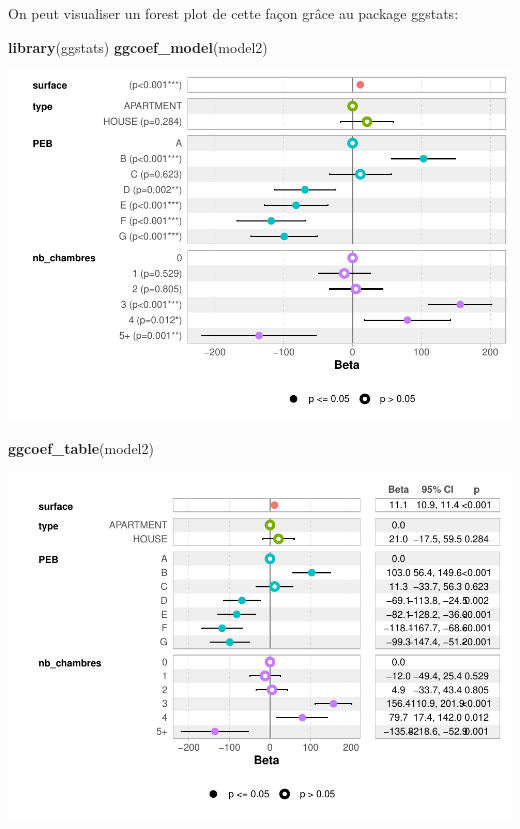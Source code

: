 \documentclass[
]{book}
\newenvironment{Shaded}{\begin{snugshade}}{\end{snugshade}}
\newcommand{\FunctionTok}[1]{\textcolor[rgb]{0.13,0.29,0.53}{\textbf{#1}}}
\newcommand{\NormalTok}[1]{#1}
\begin{document}
On peut visualiser un forest plot de cette façon grâce au package
ggstats:

\begin{Shaded}
\begin{Highlighting}[]
\FunctionTok{library}\NormalTok{(ggstats)}
\FunctionTok{ggcoef\_model}\NormalTok{(model2)}
\end{Highlighting}
\end{Shaded}

\includegraphics{manuel_geo_quanti_files/figure-latex/unnamed-chunk-20-1.pdf}

\begin{Shaded}
\begin{Highlighting}[]
\FunctionTok{ggcoef\_table}\NormalTok{(model2)}
\end{Highlighting}
\end{Shaded}

\includegraphics{manuel_geo_quanti_files/figure-latex/unnamed-chunk-20-2.pdf}
\end{document}
